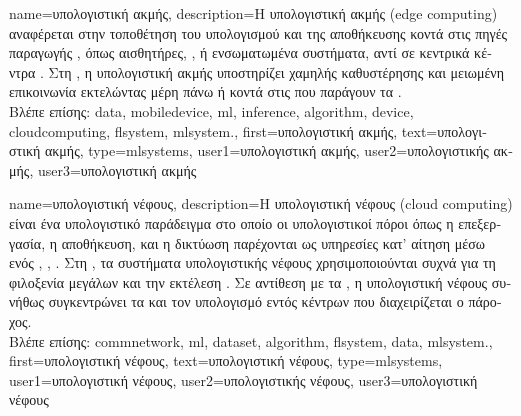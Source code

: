 {name={\foreignlanguage{greek}{υπολογιστική ακμής}},
	description={\foreignlanguage{greek}{Η υπολογιστική ακμής} (edge computing) 
		\foreignlanguage{greek}{αναφέρεται στην τοποθέτηση του υπολογισμού και της αποθήκευσης}  
		\foreignlanguage{greek}{κοντά στις πηγές παραγωγής} , \foreignlanguage{greek}{όπως αισθητήρες},
		, \foreignlanguage{greek}{ή ενσωματωμένα συστήματα, αντί σε κεντρικά κέντρα}  
		\cite{Shi2016}. \foreignlanguage{greek}{Στη} , \foreignlanguage{greek}{η υπολογιστική ακμής υποστηρίζει χαμηλής 
		καθυστέρησης}  \foreignlanguage{greek}{και μειωμένη επικοινωνία εκτελώντας μέρη}  
		 \foreignlanguage{greek}{πάνω ή κοντά στις}  \foreignlanguage{greek}{που παράγουν τα} 
		 \cite{Nguyen2019}. 
		\\
		\foreignlanguage{greek}{Βλέπε επίσης:} \gls{data}, \gls{mobiledevice}, \gls{ml}, \gls{inference}, \gls{algorithm}, \gls{device}, \gls{cloudcomputing}, 
		\gls{flsystem}, \gls{mlsystem}.},
	first={\foreignlanguage{greek}{υπολογιστική ακμής}},
	text={\foreignlanguage{greek}{υπολογιστική ακμής}},
	type=mlsystems,
	user1={\foreignlanguage{greek}{υπολογιστική ακμής}}, %
	user2={\foreignlanguage{greek}{υπολογιστικής ακμής}}, %
	user3={\foreignlanguage{greek}{υπολογιστική ακμής}} %
}

{name={\foreignlanguage{greek}{υπολογιστική νέφους}},
	description={\foreignlanguage{greek}{Η υπολογιστική νέφους} 
		(cloud computing) \foreignlanguage{greek}{είναι ένα υπολογιστικό παράδειγμα στο οποίο οι 
		υπολογιστικοί πόροι όπως η επεξεργασία, η αποθήκευση, και η δικτύωση παρέχονται ως 
		υπηρεσίες κατ' αίτηση μέσω ενός} 
		\cite{DistributedSystems}, \cite{ComerCloudComputing2021}, \cite{Armbrust2010}. 
		\foreignlanguage{greek}{Στη} , \foreignlanguage{greek}{τα συστήματα 
		υπολογιστικής νέφους χρησιμοποιούνται συχνά για τη φιλοξενία μεγάλων}  
		\foreignlanguage{greek}{και την εκτέλεση}  . 
		\foreignlanguage{greek}{Σε αντίθεση με τα} , 
		\foreignlanguage{greek}{η υπολογιστική νέφους συνήθως συγκεντρώνει τα}
		 \foreignlanguage{greek}{και τον υπολογισμό εντός κέντρων} 
		 \foreignlanguage{greek}{που διαχειρίζεται ο πάροχος}.
		\\
		\foreignlanguage{greek}{Βλέπε επίσης:} \gls{commnetwork}, \gls{ml}, \gls{dataset}, \gls{algorithm}, \gls{flsystem}, \gls{data}, 
		\gls{mlsystem}.},
	first={\foreignlanguage{greek}{υπολογιστική νέφους}},
	text={\foreignlanguage{greek}{υπολογιστική νέφους}},
	type=mlsystems,
	user1={\foreignlanguage{greek}{υπολογιστική νέφους}}, %
	user2={\foreignlanguage{greek}{υπολογιστικής νέφους}}, %
	user3={\foreignlanguage{greek}{υπολογιστική νέφους}} %
}

